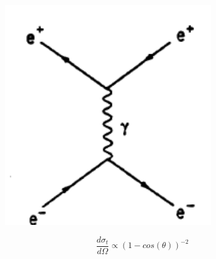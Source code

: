 \begin{frame}
\begin{minipage}{0.49\linewidth}
\begin{figure}
			\includegraphics[width=0.8\textwidth]{graphics/BhabbaStreuungpresentation.png}
		\end{figure}
	\begin{equation*}
	\qquad\frac{d\sigma_t}{d\Omega} \propto (1-cos(\theta))^{-2}
	\end{equation*}
	\end{minipage}
\end{frame}
